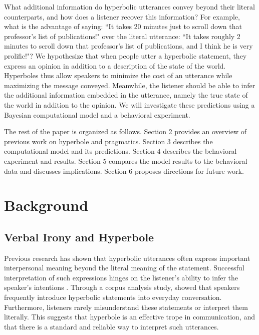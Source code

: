 \documentclass{article} %
\begin{document}
What additional information do hyperbolic utterances convey beyond their literal counterparts, and how does a listener recover this information? For example, what is the advantage of saying: ``It takes 20 minutes just to scroll down that professor's list of publications!" over the literal utterance: ``It takes roughly 2 minutes to scroll down that professor's list of publications, and I think he is very prolific!"? We hypothesize that when people utter a hyperbolic statement, they express an opinion in addition to a description of the state of the world. Hyperboles thus allow speakers to minimize the cost of an utterance while maximizing the message conveyed. Meanwhile, the listener should be able to infer the additional information embedded in the utterance, namely the true state of the world in addition to the opinion. We will investigate these predictions using a Bayesian computational model and a behavioral experiment. 

The rest of the paper is organized as follows. Section 2 provides an overview of previous work on hyperbole and pragmatics. Section 3 describes the computational model and its predictions. Section 4 describes the behavioral experiment and results. Section 5 compares the model results to the behavioral data and discusses implications. Section 6 proposes directions for future work.

\section{Background}
\subsection{Verbal Irony and Hyperbole}

Previous research has shown that hyperbolic utterances often express important interpersonal meaning beyond the literal meaning of the statement. Successful interpretation of such expressions hinges on the listener's ability to infer the speaker's intentions \cite{mccarthy2004there, gibbs2000irony, cano2003risk}. Through a corpus analysis study, \cite{cano2003risk} showed that speakers frequently introduce hyperbolic statements into everyday conversation. Furthermore, listeners rarely misunderstand these statements or interpret them literally. This suggests that hyperbole is an effective trope in communication, and that there is a standard and reliable way to interpret such utterances.
\end{document}
